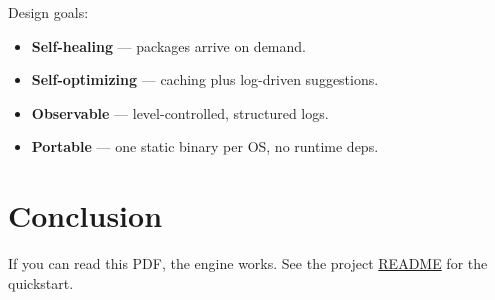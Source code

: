 \documentclass[11pt,a4paper]{article}
\begin{document}
Design goals:
\begin{itemize}
  \item \textbf{Self-healing} --- packages arrive on demand.
  \item \textbf{Self-optimizing} --- caching plus log-driven suggestions.
  \item \textbf{Observable} --- level-controlled, structured logs.
  \item \textbf{Portable} --- one static binary per OS, no runtime deps.
\end{itemize}

\section{Conclusion}
If you can read this PDF, the engine works. See the project
\href{https://github.com/m3di/texforge}{README} for the quickstart.
\end{document}
